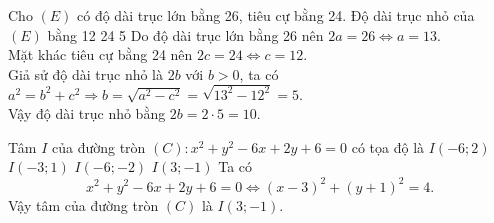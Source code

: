 \begin{ex}%
Cho $(E)$ có độ dài trục lớn bằng 26, tiêu cự bằng 24. Độ dài trục nhỏ của $(E)$ bằng
\choice
{12}
{}
{24}
{5}
\loigiai
{Do độ dài trục lớn bằng 26 nên $2a=26\Leftrightarrow a=13$.\\
Mặt khác tiêu cự bằng 24 nên $2c=24\Leftrightarrow c=12$.\\
Giả sử độ dài trục nhỏ là $2b$ với $b>0$, ta có $a^2=b^2+c^2\Rightarrow b=\sqrt{a^2-c^2}=\sqrt{13^2-12^2}=5$.\\
Vậy độ dài trục nhỏ bằng $2b=2\cdot5=10$.
}
\end{ex}

\begin{ex}%
Tâm $I$ của đường tròn $(C)\colon x^2+y^2-6x+2y+6=0$ có tọa độ là
\choice
{$I(-6;2)$}
{$I(-3;1)$}
{$I(-6;-2)$}
{\True $I(3;-1)$}
\loigiai
{Ta có 
\[x^2+y^2-6x+2y+6=0\Leftrightarrow(x-3)^2+(y+1)^2=4.\]
Vậy tâm của đường tròn $(C)$ là $I(3;-1)$.
}
\end{ex}

